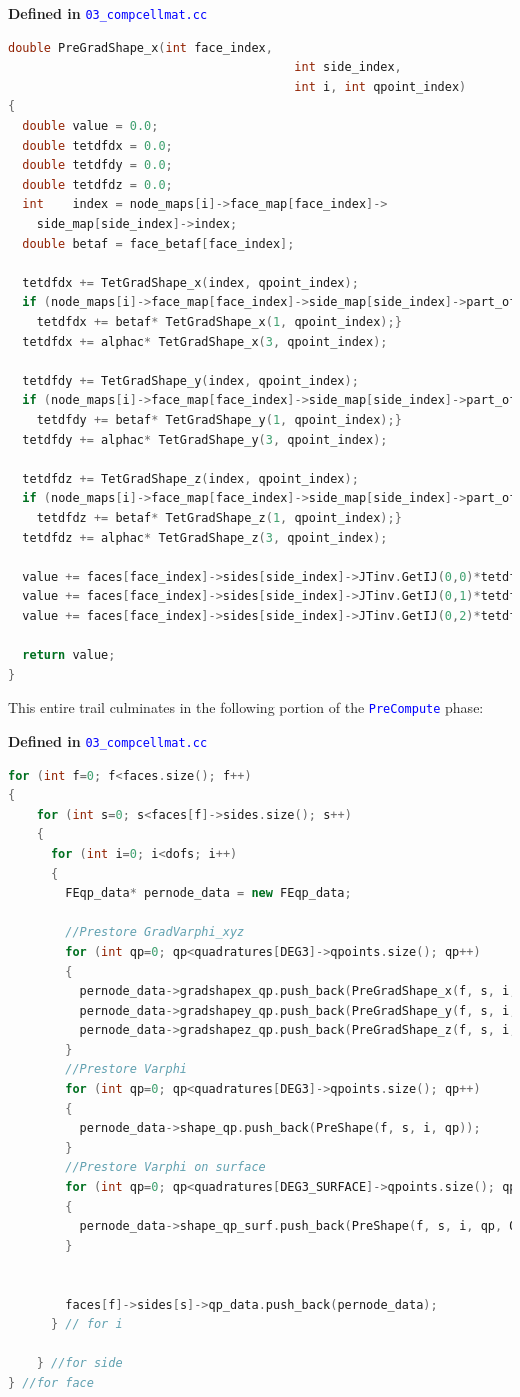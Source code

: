 \documentclass[11pt,letterpaper,titlepage]{article}
\newcommand{\xmltag}[1]{\textcolor{blue}{ \texttt{#1}} }
\begin{document}
\vspace{0.5cm}
\textbf{Defined in } \xmltag{03\_compcellmat.cc}
\begin{lstlisting}[language=c++]
double PreGradShape_x(int face_index,
                                        int side_index,
                                        int i, int qpoint_index)
{
  double value = 0.0;
  double tetdfdx = 0.0;
  double tetdfdy = 0.0;
  double tetdfdz = 0.0;
  int    index = node_maps[i]->face_map[face_index]->
    side_map[side_index]->index;
  double betaf = face_betaf[face_index];

  tetdfdx += TetGradShape_x(index, qpoint_index);
  if (node_maps[i]->face_map[face_index]->side_map[side_index]->part_of_face){
    tetdfdx += betaf* TetGradShape_x(1, qpoint_index);}
  tetdfdx += alphac* TetGradShape_x(3, qpoint_index);

  tetdfdy += TetGradShape_y(index, qpoint_index);
  if (node_maps[i]->face_map[face_index]->side_map[side_index]->part_of_face){
    tetdfdy += betaf* TetGradShape_y(1, qpoint_index);}
  tetdfdy += alphac* TetGradShape_y(3, qpoint_index);

  tetdfdz += TetGradShape_z(index, qpoint_index);
  if (node_maps[i]->face_map[face_index]->side_map[side_index]->part_of_face){
    tetdfdz += betaf* TetGradShape_z(1, qpoint_index);}
  tetdfdz += alphac* TetGradShape_z(3, qpoint_index);

  value += faces[face_index]->sides[side_index]->JTinv.GetIJ(0,0)*tetdfdx;
  value += faces[face_index]->sides[side_index]->JTinv.GetIJ(0,1)*tetdfdy;
  value += faces[face_index]->sides[side_index]->JTinv.GetIJ(0,2)*tetdfdz;

  return value;
}
\end{lstlisting}

This entire trail culminates in the following portion of the \xmltag{PreCompute} phase:

\vspace{0.5cm}
\textbf{Defined in } \xmltag{03\_compcellmat.cc}
\begin{lstlisting}[language=c++]
for (int f=0; f<faces.size(); f++)
{
    for (int s=0; s<faces[f]->sides.size(); s++)
    {
      for (int i=0; i<dofs; i++)
      {
        FEqp_data* pernode_data = new FEqp_data;

        //Prestore GradVarphi_xyz
        for (int qp=0; qp<quadratures[DEG3]->qpoints.size(); qp++)
        {
          pernode_data->gradshapex_qp.push_back(PreGradShape_x(f, s, i, qp));
          pernode_data->gradshapey_qp.push_back(PreGradShape_y(f, s, i, qp));
          pernode_data->gradshapez_qp.push_back(PreGradShape_z(f, s, i, qp));
        }
        //Prestore Varphi
        for (int qp=0; qp<quadratures[DEG3]->qpoints.size(); qp++)
        {
          pernode_data->shape_qp.push_back(PreShape(f, s, i, qp));
        }
        //Prestore Varphi on surface
        for (int qp=0; qp<quadratures[DEG3_SURFACE]->qpoints.size(); qp++)
        {
          pernode_data->shape_qp_surf.push_back(PreShape(f, s, i, qp, ON_SURFACE));
        }


        faces[f]->sides[s]->qp_data.push_back(pernode_data);
      } // for i

    } //for side
} //for face
\end{lstlisting}
\end{document}
